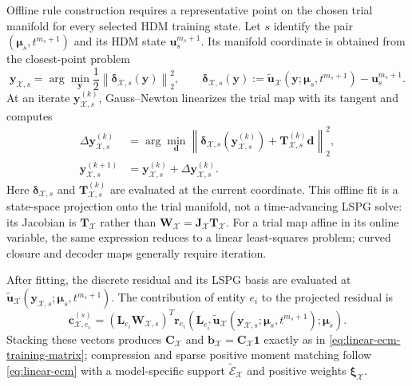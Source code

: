 \documentclass[11pt]{article}
\newcommand{\uvec}{\mathbf u}
\newcommand{\utilde}{\widetilde{\mathbf u}}
\newcommand{\mub}{\bm\mu}
\newcommand{\norm}[1]{\left\lVert #1 \right\rVert}
\begin{document}
Offline rule construction requires a representative point on the chosen
trial manifold for every selected HDM training state.  Let $s$ identify the
pair $(\mub_s,t^{m_s+1})$ and its HDM state $\uvec_s^{m_s+1}$.  Its manifold
coordinate is obtained from the closest-point problem
\begin{equation}
\mathbf y_{\mathcal X,s}
=\arg\min_{\mathbf y}
\frac12\norm{\boldsymbol\delta_{\mathcal X,s}(\mathbf y)}_2^2,
\qquad
\boldsymbol\delta_{\mathcal X,s}(\mathbf y)
:=\utilde_{\mathcal X}(\mathbf y;\mub_s,t^{m_s+1})
-\uvec_s^{m_s+1}.
\label{eq:nonlinear-manifold-fit}
\end{equation}
At an iterate $\mathbf y_{\mathcal X,s}^{(k)}$, Gauss--Newton linearizes the
trial map with its tangent and computes
\begin{equation}
\begin{aligned}
\Delta\mathbf y_{\mathcal X,s}^{(k)}
&=\arg\min_{\mathbf d}
\norm{\boldsymbol\delta_{\mathcal X,s}
(\mathbf y_{\mathcal X,s}^{(k)})
+\mathbf T_{\mathcal X,s}^{(k)}\mathbf d}_2^2,\\
\mathbf y_{\mathcal X,s}^{(k+1)}
&=\mathbf y_{\mathcal X,s}^{(k)}
+\Delta\mathbf y_{\mathcal X,s}^{(k)}.
\end{aligned}
\label{eq:nonlinear-manifold-fit-gn}
\end{equation}
Here $\boldsymbol\delta_{\mathcal X,s}$ and
$\mathbf T_{\mathcal X,s}^{(k)}$ are evaluated at the current coordinate.
This offline fit is a state-space projection onto the trial manifold, not a
time-advancing LSPG solve: its Jacobian is $\mathbf T_{\mathcal X}$ rather
than $\mathbf W_{\mathcal X}=\mathbf J_{\mathcal X}\mathbf T_{\mathcal X}$.
For a trial map affine in its online variable, the same expression reduces
to a linear least-squares problem; curved closure and decoder maps generally
require iteration.

After fitting, the discrete residual and its LSPG basis are evaluated at
$\utilde_{\mathcal X}(\mathbf y_{\mathcal X,s};\mub_s,t^{m_s+1})$.  The
contribution of entity $e_i$ to the projected residual is
\begin{equation}
\mathbf c_{\mathcal X,e_i}^{(s)}
=(\mathbf L_{e_i}\mathbf W_{\mathcal X,s})^T
\mathbf r_{e_i}(\mathbf L_{e_i^+}
\utilde_{\mathcal X}(\mathbf y_{\mathcal X,s};\mub_s,t^{m_s+1});\mub_s).
\label{eq:nonlinear-ecm-contribution}
\end{equation}
Stacking these vectors produces $\mathbf C_{\mathcal X}$ and
$\mathbf b_{\mathcal X}=\mathbf C_{\mathcal X}\mathbf1$ exactly as in
\eqref{eq:linear-ecm-training-matrix}; compression and sparse positive
moment matching follow \eqref{eq:linear-ecm} with a model-specific support
$\widetilde{\mathcal E}_{\mathcal X}$ and positive weights
$\boldsymbol\xi_{\mathcal X}$.
\end{document}
